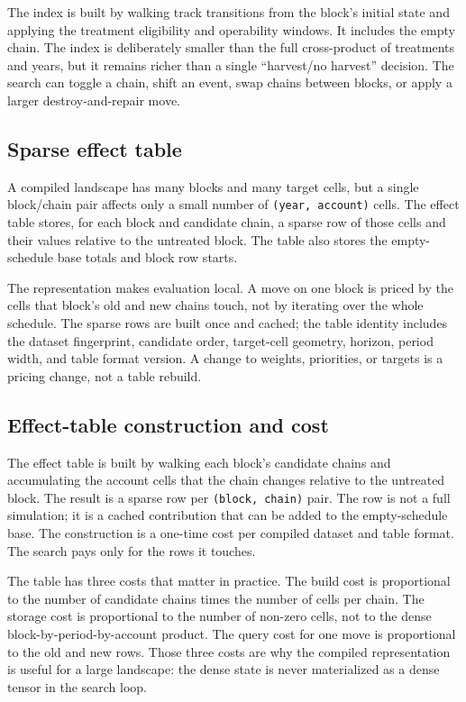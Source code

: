 \documentclass[preprint,11pt]{elsarticle}
\begin{document}
The index is built by walking track transitions from the block's initial state and applying the treatment eligibility and operability windows. It includes the empty chain. The index is deliberately smaller than the full cross-product of treatments and years, but it remains richer than a single ``harvest/no harvest'' decision. The search can toggle a chain, shift an event, swap chains between blocks, or apply a larger destroy-and-repair move.

\subsection{Sparse effect table}\label{sparse-effect-table}

A compiled landscape has many blocks and many target cells, but a single block/chain pair affects only a small number of \texttt{(year,\ account)} cells. The effect table stores, for each block and candidate chain, a sparse row of those cells and their values relative to the untreated block. The table also stores the empty-schedule base totals and block row starts.

The representation makes evaluation local. A move on one block is priced by the cells that block's old and new chains touch, not by iterating over the whole schedule. The sparse rows are built once and cached; the table identity includes the dataset fingerprint, candidate order, target-cell geometry, horizon, period width, and table format version. A change to weights, priorities, or targets is a pricing change, not a table rebuild.

\subsection{Effect-table construction and cost}

The effect table is built by walking each block's candidate chains and accumulating the account cells
that the chain changes relative to the untreated block. The result is a sparse row per
\texttt{(block, chain)} pair. The row is not a full simulation; it is a cached contribution that can
be added to the empty-schedule base. The construction is a one-time cost per compiled dataset and table
format. The search pays only for the rows it touches.

The table has three costs that matter in practice. The build cost is proportional to the number of
candidate chains times the number of cells per chain. The storage cost is proportional to the number
of non-zero cells, not to the dense block-by-period-by-account product. The query cost for one move is
proportional to the old and new rows. Those three costs are why the compiled representation is useful
for a large landscape: the dense state is never materialized as a dense tensor in the search loop.
\end{document}
